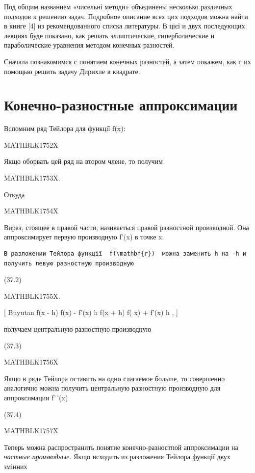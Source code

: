 \documentclass[
  ukrainian,
]{article}
\begin{document}
Под общим названием «чисельні методи» объединены несколько различных
подходов к решению задач. Подробное описание всех цих подходов можна
найти в книге {[}4{]} из рекомендованного списка литературы. В цієї и
двух последующих лекциях буде показано, как решать эллиптические,
гиперболические и параболические уравнения методом конечных разностей.

Сначала познакомимся с понятием конечных разностей, а затем покажем, как
с их помощью решить задачу Дирихле в квадрате.

\section{Конечно-разностные
аппроксимации}\label{ux43aux43eux43dux435ux447ux43dux43e-ux440ux430ux437ux43dux43eux441ux442ux43dux44bux435-ux430ux43fux43fux440ux43eux43aux441ux438ux43cux430ux446ux438ux438}

Вспомним ряд Тейлора для функції f(x):

MATHBLK1752X

Якщо оборвать цей ряд на втором члене, то получим

MATHBLK1753X.

Откуда

MATHBLK1754X

Вираз, стоящее в правой части, називається правой разностной
производной. Она аппроксимирует первую производную f'(x) в точке x.

\begin{verbatim}
В разложении Тейлора функції  f(\mathbf{r})  можна заменить h на -h и получить левую разностную производную
\end{verbatim}

(37.2)

MATHBLK1755X.

{[} Buyutan f(x - h) \cong f(x) - f'(x) h \nif  f(x + h) \cong f( x) +
f'(x) h , {]}

получаем центральную разностную производную

(37.3)

MATHBLK1756X

Якщо в ряде Тейлора оставить на одно слагаемое больше, то совершенно
аналогично можна получить центральную разностную производную для
аппроксимации f'\,'(x)

(37.4)

MATHBLK1757X

Теперь можна распространить понятие конечно-разностпой аппроксимации на
\emph{частные производные}. Якщо исходить из разложения Тейлора функції
двух змінних
\end{document}
